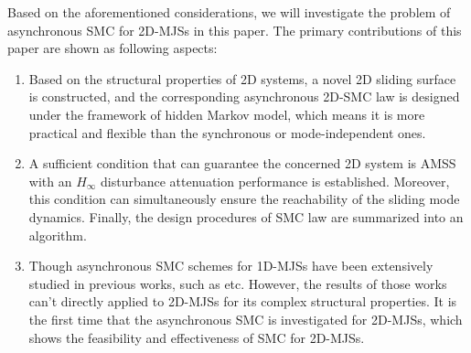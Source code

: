\documentclass[journal,final,twocolumn]{IEEEtran}
\begin{document}
	Based on the aforementioned considerations, we will investigate the problem of asynchronous SMC for 2D-MJSs in this paper. 
	The primary contributions of this paper are shown as following aspects:
	\begin{enumerate}
		\item Based on the structural properties of 2D systems, a novel 2D sliding surface is constructed, and the corresponding asynchronous 2D-SMC law is designed under the framework of hidden Markov model, which means it is more practical and flexible than the synchronous or mode-independent ones.
		\item  A sufficient condition that can guarantee the concerned 2D system is AMSS with an  $H_{\infty}$ disturbance attenuation performance is established. Moreover, this condition can simultaneously ensure the reachability of the sliding mode dynamics. Finally, the  design procedures of SMC law are summarized into an algorithm. 
		\item Though asynchronous SMC schemes for 1D-MJSs have been extensively studied in previous works, such as \cite{song2018asynchronous,li2017passivity,qi2018observer} etc. However, the results of those works can't directly applied to 2D-MJSs for its complex structural properties. It is the first time that the asynchronous SMC is investigated for 2D-MJSs, which shows the feasibility and effectiveness of SMC for 2D-MJSs.   
	\end{enumerate}
\end{document}
